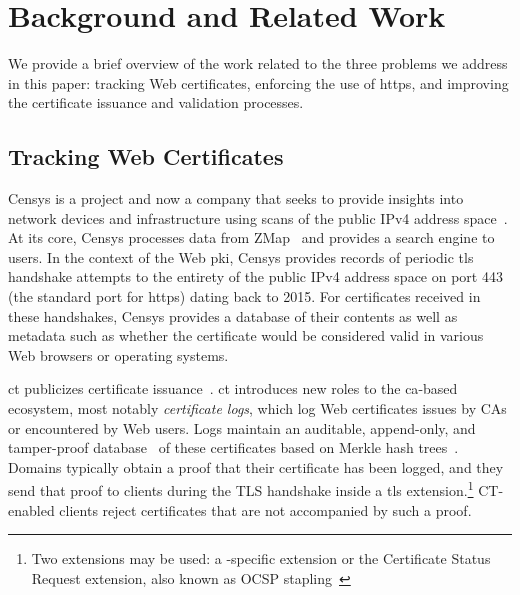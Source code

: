 \section{Background and Related Work}
\label{sec:background}

We provide a brief overview of the work related to the
three problems we address in this paper: tracking Web certificates, enforcing
the use of \ac{https}, and improving the certificate issuance and validation
processes.

\subsection{Tracking Web Certificates}\label{sec:tracking}

Censys is a project and now a company that seeks to provide insights into
network devices and infrastructure using scans of the public IPv4 address
space~\cite{durumeric2015search}. At its core, Censys processes data from
ZMap~\cite{durumeric2013zmap} and provides a search engine to users. In the
context of the Web \ac{pki}, Censys provides records of periodic \ac{tls}
handshake attempts to the entirety of the public IPv4 address space on port 443
(the standard port for \ac{https}) dating back to 2015. For certificates
received in these handshakes, Censys provides a database of their contents as
well as metadata such as whether the certificate would be considered valid in
various Web browsers or operating systems.

\acf{ct} publicizes certificate issuance~\cite{rfc6962}. 
\ac{ct} introduces new roles to the \ac{ca}-based
ecosystem, most notably \emph{certificate logs}, 
which log Web certificates issues by CAs or encountered by Web users.
Logs maintain an auditable, append-only, and tamper-proof database~\cite{crosby2009efficient} of
these certificates based on Merkle hash trees~\cite{merkle1988digital}. 
Domains typically obtain a proof that their certificate
has been logged, and they send that proof to clients during 
the TLS handshake inside a \ac{tls} extension.\footnote{Two extensions may be used: a
-specific extension or the Certificate Status Request extension, also
known as OCSP stapling~\cite{rfc6066}}
CT-enabled clients reject certificates that are not accompanied by such a proof.

